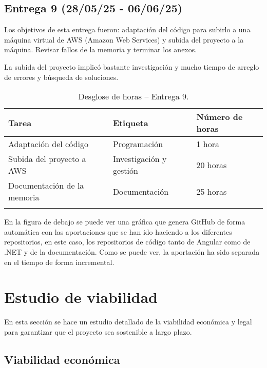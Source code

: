 \subsection{Entrega 9 (28/05/25 - 06/06/25)}

Los objetivos de esta entrega fueron: adaptación del código para subirlo a una máquina virtual de AWS (Amazon Web Services) y subida del proyecto a la máquina. Revisar fallos de la memoria y terminar los anexos.

La subida del proyecto implicó bastante investigación y mucho tiempo de arreglo de errores y búsqueda de soluciones.

\begin{longtable}{@{} p{6cm} p{3cm} p{3cm} @{}}
  \toprule
  \rowcolor{gray!20}
  Tarea & Etiqueta & Número de horas \\ 
  \midrule
  \endhead
  Adaptación del código  & Programación  & 1 hora \\ 
  \midrule

  Subida del proyecto a AWS  & Investigación y gestión & 20 horas \\ 
  \midrule

  Documentación de la memoria & Documentación  &  25 horas \\ 
  \midrule

  \bottomrule
  \caption{Desglose de horas -- Entrega 9.}
\end{longtable}

En la figura de debajo se puede ver una gráfica que genera GitHub de forma automática con las aportaciones que se han ido haciendo a los diferentes repositorios, en este caso, los repositorios de código tanto de Angular como de .NET y de la documentación. Como se puede ver, la aportación ha sido separada en el tiempo de forma incremental.


\section{Estudio de viabilidad}

En esta sección se hace un estudio detallado de la viabilidad económica y legal para garantizar que el proyecto sea sostenible a largo plazo.

\subsection{Viabilidad económica}

